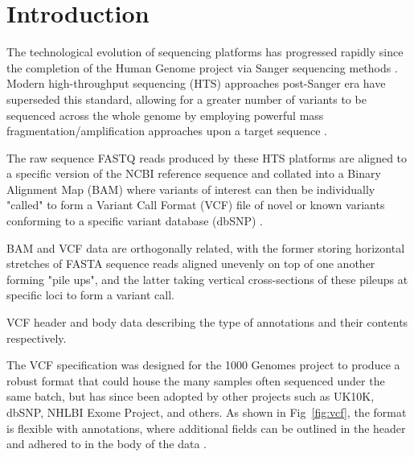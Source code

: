 
\section{Introduction}


The technological evolution of sequencing platforms has progressed rapidly since the completion of the Human Genome project via Sanger sequencing methods \citep{lander2001initial,sanger1977dna}. Modern high-throughput sequencing (HTS) approaches post-Sanger era have superseded this standard, allowing for a greater number of variants to be sequenced across the whole genome by employing powerful mass fragmentation/amplification approaches upon a target sequence \citep{lengauer2007bioinformatics,bockenhauer2012genetic}.


The raw sequence FASTQ reads produced by these HTS platforms are aligned to a specific version of the NCBI reference sequence and collated into a Binary Alignment Map (BAM) where variants of interest can then be individually "called" to form a Variant Call Format (VCF) file of novel or known variants conforming to a specific variant database (dbSNP) \citep{li2009sequence,danecek2011variant}.

BAM and VCF data are orthogonally related, with the former storing horizontal stretches of FASTA sequence reads aligned unevenly on top of one another forming "pile ups", and the latter taking vertical cross-sections of these pileups at specific loci to form a variant call.



{VCF header and body data describing the type of annotations and their contents respectively.}


The VCF specification was designed for the 1000 Genomes project to produce a robust format that could house the many samples often sequenced under the same batch, but has since been adopted by other projects such as UK10K, dbSNP, NHLBI Exome Project, and others. As shown in Fig~\ref{fig:vcf}, the format is flexible with annotations, where additional fields can be outlined in the header and adhered to in the body of the data \citep{danecek2011variant}. 

